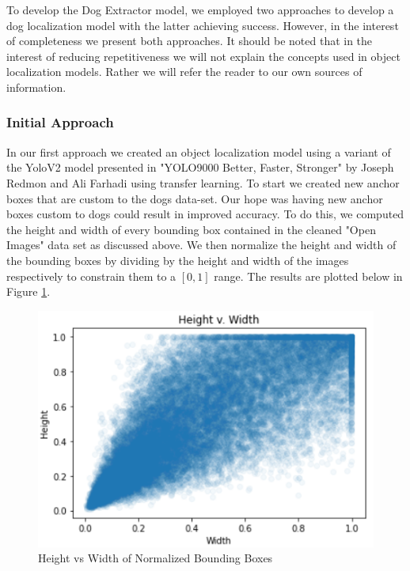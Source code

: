 \documentclass{article}
\begin{document}
To develop the Dog Extractor model, we employed two approaches to develop a dog localization model with the latter achieving success.  However, in the interest of completeness we present both approaches.  It should be noted that in the interest of reducing repetitiveness we will not explain the concepts used in object localization models.  Rather we will refer the reader to our own sources of information.

\subsubsection{Initial Approach}

In our first approach we created an object localization model using a variant of the YoloV2 model presented in "YOLO9000 Better, Faster, Stronger" by Joseph Redmon and Ali Farhadi using transfer learning.   To start we created new anchor boxes that are custom to the dogs data-set.  Our hope was having new anchor boxes custom to dogs could result in improved accuracy.  To do this, we computed the height and width of every bounding box contained in the cleaned "Open Images" data set as discussed above.  We then normalize the height and width of the bounding boxes by dividing by the height and width of the images respectively to constrain them to a $[0,1]$ range.  The results are plotted below in Figure \ref{fig:x height_v_width}.

\newpage

\begin{figure}[h]
\centering
	\includegraphics[scale=0.8]{final-report-images/box_height_v_width.png}
\caption{Height vs Width of Normalized Bounding Boxes}
\label{fig:x height_v_width}
\end{figure}
\end{document}
